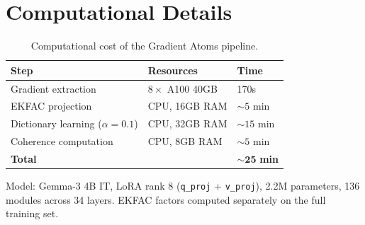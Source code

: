 \documentclass{article} %
\begin{document}
\section{Computational Details}

\begin{table}[h]
\centering
\caption{Computational cost of the Gradient Atoms pipeline.}
\label{tab:compute}
\begin{tabular}{lll}
\toprule
Step & Resources & Time \\
\midrule
Gradient extraction & $8\times$ A100 40GB & 170s \\
EKFAC projection & CPU, 16GB RAM & ${\sim}5$ min \\
Dictionary learning ($\alpha=0.1$) & CPU, 32GB RAM & ${\sim}15$ min \\
Coherence computation & CPU, 8GB RAM & ${\sim}5$ min \\
\midrule
\textbf{Total} & & $\mathbf{{\sim}25}$ \textbf{min} \\
\bottomrule
\end{tabular}
\end{table}

Model: Gemma-3 4B IT, LoRA rank 8 (\texttt{q\_proj} + \texttt{v\_proj}), 2.2M parameters, 136 modules across 34 layers. EKFAC factors computed separately on the full training set.
















\break
\appendix
\end{document}
